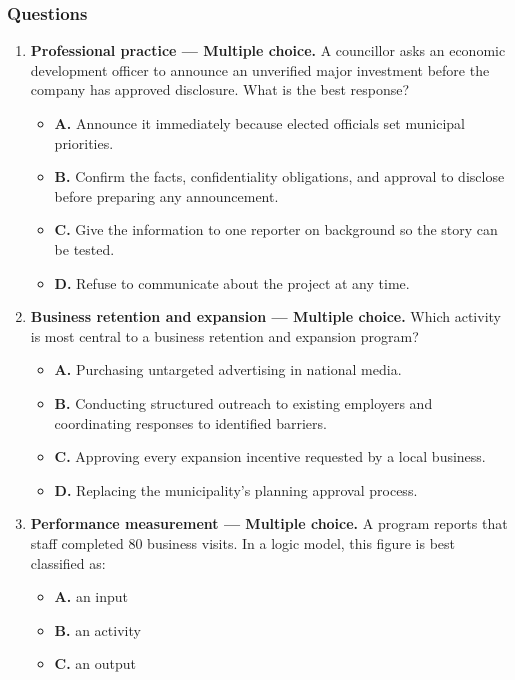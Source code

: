 \documentclass[11pt,letterpaper,oneside,openany]{book}
\begin{document}
\subsubsection*{Questions}
\begin{enumerate}[leftmargin=*,itemsep=1.1em]
\item \textbf{Professional practice --- Multiple choice.} A councillor asks an economic development officer to announce an unverified major investment before the company has approved disclosure. What is the best response?
\begin{itemize}[leftmargin=1.7em]
\item \textbf{A.} Announce it immediately because elected officials set municipal priorities.
\item \textbf{B.} Confirm the facts, confidentiality obligations, and approval to disclose before preparing any announcement.
\item \textbf{C.} Give the information to one reporter on background so the story can be tested.
\item \textbf{D.} Refuse to communicate about the project at any time.
\end{itemize}
\item \textbf{Business retention and expansion --- Multiple choice.} Which activity is most central to a business retention and expansion program?
\begin{itemize}[leftmargin=1.7em]
\item \textbf{A.} Purchasing untargeted advertising in national media.
\item \textbf{B.} Conducting structured outreach to existing employers and coordinating responses to identified barriers.
\item \textbf{C.} Approving every expansion incentive requested by a local business.
\item \textbf{D.} Replacing the municipality's planning approval process.
\end{itemize}
\item \textbf{Performance measurement --- Multiple choice.} A program reports that staff completed 80 business visits. In a logic model, this figure is best classified as:
\begin{itemize}[leftmargin=1.7em]
\item \textbf{A.} an input
\item \textbf{B.} an activity
\item \textbf{C.} an output

\end{itemize}
\end{enumerate}
\end{document}
